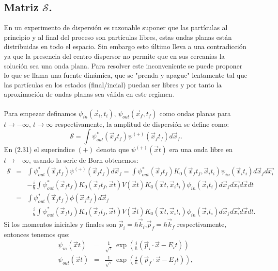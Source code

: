 \subsection{Matriz $\mathcal{S}$.}
En un experimento de dispersión es razonable suponer que las partículas al principio y al final del proceso son partículas libres, estas ondas planas están distribuidas en todo el espacio. Sin embargo esto último lleva a una contradicción ya que la presencia del centro dispersor no permite que en sus cercanias la solución sea una onda plana. Para resolver este inconveniente se puede proponer lo que se llama una fuente dinámica, que se "prenda y apague" lentamente tal que las partículas en los estados (final/incial) puedan ser libres y por tanto la aproximación de ondas planas sea válida en este regimen.\\
\\
Para empezar definamos $\psi_{in}(\vec{x}_i,t_i)$, $\psi_{out}(\vec{x}_f,t_f)$ como ondas planas para $t\to -\infty$,  $t\to \infty$ respectivamente, la amplitud de dispersión se define como:
\begin{equation}
\mathcal{S}=\int\psi_{out}^{*}(\vec{x}_{f}t_{f})\psi^{(+)}(\vec{x}_{f}t_{f})d\vec{x}_{f}.
\end{equation}
En (2.31) el superíndice $(+)$ denota que $\psi^{(+)}(\vec{x}t)$ era una onda libre en $t\to -\infty$, usando la serie de Born obtenemos:
\begin{eqnarray}
\nonumber \mathcal{S}&=&\int\psi_{out}^{*}(\vec{x}_{f}t_{f})\psi^{(+)}(\vec{x}_{f}t_{f})d\vec{x}_{f}=\int\psi_{out}^{*}(\vec{x}_{f}t_{f})K_{0}(\vec{x}_{f}t_{f},\vec{x}_{i}t_{i})\psi_{in}(\vec{x}_{i}t_{i})d\vec{x}_{f}d\vec{x_{i}}\\
\nonumber &&-\frac{i}{\hbar}\int\psi_{out}^{*}(\vec{x}_{f}t_{f})K_{0}(\vec{x}_{f}t_{f},\vec{x}t)V(\vec{x}t)K_{0}(\vec{x}t,\vec{x}_{i}t_{i})\psi_{in}(\vec{x}_{i}t_{i})d\vec{x}_{f}d\vec{x_{i}}d\vec{x}dt\\
\nonumber &=&\int \psi_{out}^{*}(\vec{x}_{f}t_{f})\phi(\vec{x}_{f}t_{f})d\vec{x}_f\\
&&-\frac{i}{\hbar}\int\psi_{out}^{*}(\vec{x}_{f}t_{f})K_{0}(\vec{x}_{f}t_{f},\vec{x}t)V(\vec{x}t)K_{0}(\vec{x}t,\vec{x}_{i}t_{i})\psi_{in}(\vec{x}_{i}t_{i})d\vec{x}_{f}d\vec{x_{i}}d\vec{x}dt.   
\end{eqnarray}
Si los momentos iniciales y finales son $\vec{p}_i=\hbar\vec{k}_i$,$\vec{p}_f=\hbar\vec{k}_f$ respectivamente, entonces tenemos que:
\begin{eqnarray}
\psi_{in}(\vec{x}t)&=&\frac{1}{\sqrt{\tau}}\ \exp\left( \frac{i}{\hbar}(\vec{p}_i\cdot \vec{x}-E_it )\right)\\
\psi_{out}(\vec{x}t)&=&\frac{1}{\sqrt{\tau}}\ \exp\left( \frac{i}{\hbar}(\vec{p}_f\cdot \vec{x}-E_ft )\right),
\end{eqnarray}
